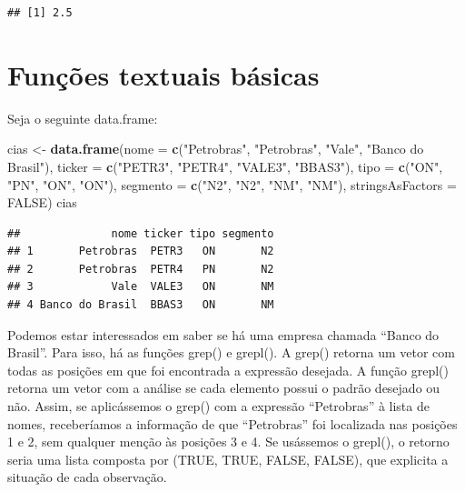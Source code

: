 \documentclass[
]{book}
\newenvironment{Shaded}{\begin{snugshade}}{\end{snugshade}}
\newcommand{\DataTypeTok}[1]{\textcolor[rgb]{0.13,0.29,0.53}{#1}}
\newcommand{\KeywordTok}[1]{\textcolor[rgb]{0.13,0.29,0.53}{\textbf{#1}}}
\newcommand{\NormalTok}[1]{#1}
\newcommand{\OtherTok}[1]{\textcolor[rgb]{0.56,0.35,0.01}{#1}}
\newcommand{\StringTok}[1]{\textcolor[rgb]{0.31,0.60,0.02}{#1}}
\begin{document}
\begin{verbatim}
## [1] 2.5
\end{verbatim}

\hypertarget{funuxe7uxf5es-textuais-buxe1sicas}{%
\section{Funções textuais básicas}\label{funuxe7uxf5es-textuais-buxe1sicas}}

Seja o seguinte data.frame:

\begin{Shaded}
\begin{Highlighting}[]
\NormalTok{cias <-}\StringTok{ }\KeywordTok{data.frame}\NormalTok{(}\DataTypeTok{nome =} \KeywordTok{c}\NormalTok{(}\StringTok{"Petrobras"}\NormalTok{, }\StringTok{"Petrobras"}\NormalTok{, }\StringTok{"Vale"}\NormalTok{, }\StringTok{"Banco do Brasil"}\NormalTok{),}
                   \DataTypeTok{ticker =} \KeywordTok{c}\NormalTok{(}\StringTok{"PETR3"}\NormalTok{, }\StringTok{"PETR4"}\NormalTok{, }\StringTok{"VALE3"}\NormalTok{, }\StringTok{"BBAS3"}\NormalTok{),}
                   \DataTypeTok{tipo =} \KeywordTok{c}\NormalTok{(}\StringTok{"ON"}\NormalTok{, }\StringTok{"PN"}\NormalTok{, }\StringTok{"ON"}\NormalTok{, }\StringTok{"ON"}\NormalTok{),}
                   \DataTypeTok{segmento =} \KeywordTok{c}\NormalTok{(}\StringTok{"N2"}\NormalTok{, }\StringTok{"N2"}\NormalTok{, }\StringTok{"NM"}\NormalTok{, }\StringTok{"NM"}\NormalTok{),}
                   \DataTypeTok{stringsAsFactors =} \OtherTok{FALSE}\NormalTok{)}
\NormalTok{cias}
\end{Highlighting}
\end{Shaded}

\begin{verbatim}
##              nome ticker tipo segmento
## 1       Petrobras  PETR3   ON       N2
## 2       Petrobras  PETR4   PN       N2
## 3            Vale  VALE3   ON       NM
## 4 Banco do Brasil  BBAS3   ON       NM
\end{verbatim}

Podemos estar interessados em saber se há uma empresa chamada ``Banco do Brasil''. Para isso, há as funções grep() e grepl(). A grep() retorna um vetor com todas as posições em que foi encontrada a expressão desejada. A função grepl() retorna um vetor com a análise se cada elemento possui o padrão desejado ou não. Assim, se aplicássemos o grep() com a expressão ``Petrobras'' à lista de nomes, receberíamos a informação de que ``Petrobras'' foi localizada nas posições 1 e 2, sem qualquer menção às posições 3 e 4. Se usássemos o grepl(), o retorno seria uma lista composta por (TRUE, TRUE, FALSE, FALSE), que explicita a situação de cada observação.
\end{document}

